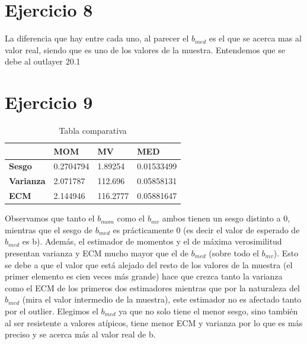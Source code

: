 \documentclass{article}
\begin{document}
\section{Ejercicio 8}
La diferencia que hay entre cada uno, al parecer el $b_{med}$ es el que se acerca mas al valor real, siendo que es uno de los valores de la muestra. Entendemos que se debe al outlayer 20.1

\newpage

\section{Ejercicio 9}
\newline

\begin{table}[h!]
\centering
\caption{Tabla comparativa}
\label{my-label}
\begin{tabular}{llll}
\hline
\multicolumn{1}{|l|}{}                  & \multicolumn{1}{l|}{\textbf{MOM}} & \multicolumn{1}{l|}{\textbf{MV}} & \multicolumn{1}{l|}{\textbf{MED}} \\ \hline
\multicolumn{1}{|l|}{\textbf{Sesgo}}    & \multicolumn{1}{l|}{0.2704794}   & \multicolumn{1}{l|}{1.89254}   & \multicolumn{1}{l|}{0.01533499}    \\ \hline
\multicolumn{1}{|l|}{\textbf{Varianza}} & \multicolumn{1}{l|}{2.071787}     & \multicolumn{1}{l|}{112.696}    & \multicolumn{1}{l|}{0.05858131}   \\ \hline
\multicolumn{1}{|l|}{\textbf{ECM}}      & \multicolumn{1}{l|}{2.144946}     & \multicolumn{1}{l|}{116.2777}    & \multicolumn{1}{l|}{0.05881647}    \\ \hline

\end{tabular}
\end{table}
Observamos que tanto el $b_{mom}$ como el $b_{mv}$ ambos tienen un sesgo distinto a 0, mientras que el sesgo de $b_{med}$ es prácticamente 0 (es decir el valor de esperado de $b_{med}$ es b). Además, el estimador de momentos y el de máxima verosimilitud presentan varianza y ECM mucho mayor que el de $b_{med}$ (sobre todo el $b_{mv}$). Esto se debe a que el valor que está alejado del resto de los valores de la muestra (el primer elemento es cien veces más grande) hace que crezca tanto la varianza como el ECM de los primeros dos estimadores mientras que por la naturaleza del $b_{med}$ (mira el valor intermedio de la muestra), este estimador no es afectado tanto por el outlier. Elegimos el $b_{med}$ ya que no solo tiene el menor sesgo, sino también al ser resistente a valores atípicos, tiene menor ECM y varianza por lo que es más preciso y se acerca más al valor real de b.
\end{document}
